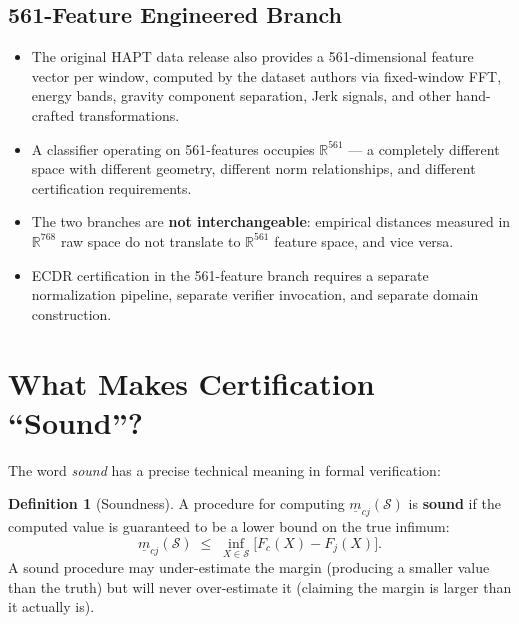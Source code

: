 \documentclass[11pt, a4paper]{article}
\theoremstyle{definition}
\newtheorem{definition}{Definition}[section]
\theoremstyle{plain}
\newcommand{\R}{\mathbb{R}}
\begin{document}
\subsection{561-Feature Engineered Branch}
\begin{itemize}[leftmargin=1.5em]
  \item The original HAPT data release also provides a 561-dimensional feature
        vector per window, computed by the dataset authors via fixed-window FFT,
        energy bands, gravity component separation, Jerk signals, and other
        hand-crafted transformations.
  \item A classifier operating on 561-features occupies $\R^{561}$ — a completely
        different space with different geometry, different norm relationships,
        and different certification requirements.
  \item The two branches are \textbf{not interchangeable}: empirical distances
        measured in $\R^{768}$ raw space do not translate to $\R^{561}$ feature
        space, and vice versa.
  \item ECDR certification in the 561-feature branch requires a separate
        normalization pipeline, separate verifier invocation, and separate
        domain construction.
\end{itemize}

\section{What Makes Certification ``Sound''?}

The word \emph{sound} has a precise technical meaning in formal verification:

\begin{definition}[Soundness]
  A procedure for computing $\underline{m}_{cj}(\mathcal{S})$ is \textbf{sound}
  if the computed value is guaranteed to be a lower bound on the true infimum:
  \[
    \underline{m}_{cj}(\mathcal{S}) \;\le\; \inf_{X \in \mathcal{S}} \bigl[F_c(X) - F_j(X)\bigr].
  \]
  A sound procedure may under-estimate the margin (producing a smaller value than
  the truth) but will never over-estimate it (claiming the margin is larger than
  it actually is).
\end{definition}
\end{document}
